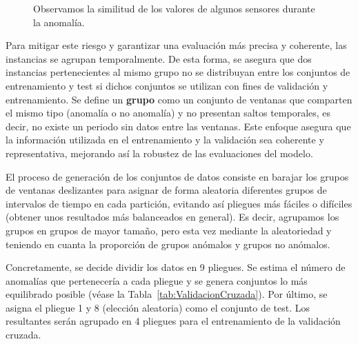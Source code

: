 \documentclass[12pt,letterpaper]{article}
\begin{document}
\begin{figure}[htp]
        \centering
        \caption{Observamos la similitud de los valores de algunos sensores durante la anomalía.}
        \label{fig:PruebaAgrupacion}
\end{figure}

Para mitigar este riesgo y garantizar una evaluación más precisa y coherente, las instancias se agrupan temporalmente. De esta forma, se asegura que dos instancias pertenecientes al mismo grupo no se distribuyan entre los conjuntos de entrenamiento y test si dichos conjuntos se utilizan con fines de validación y entrenamiento. Se define un \textbf{grupo} como un conjunto de ventanas que comparten el mismo tipo (anomalía o no anomalía) y no presentan saltos temporales, es decir, no existe un periodo sin datos entre las ventanas. Este enfoque asegura que la información utilizada en el entrenamiento y la validación sea coherente y representativa, mejorando así la robustez de las evaluaciones del modelo.

El proceso de generación de los conjuntos de datos consiste en barajar los grupos de ventanas deslizantes para asignar de forma aleatoria diferentes grupos de intervalos de tiempo en cada partición, 
evitando así pliegues más fáciles o difíciles (obtener unos resultados más balanceados en general). Es decir, agrupamos los grupos en grupos de mayor tamaño, pero esta vez mediante la aleatoriedad y teniendo en cuanta la proporción de grupos anómalos y grupos no anómalos.

Concretamente, se decide dividir los datos en 9 pliegues. Se estima el número de anomalías que pertenecería a cada pliegue y se genera conjuntos lo más equilibrado posible (véase la Tabla~\ref{tab:ValidacionCruzada}). 
Por último, se asigna el pliegue 1 y 8 (elección aleatoria) como el conjunto de test. Los resultantes serán agrupado en 4 pliegues para el entrenamiento de la validación cruzada. 
\end{document}
